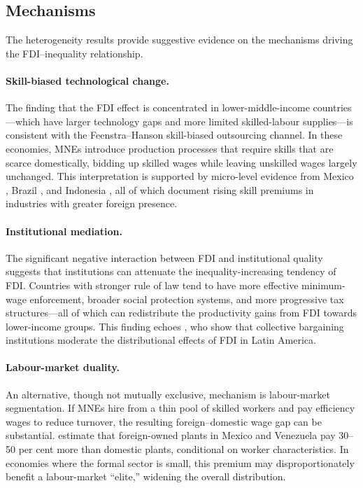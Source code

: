\documentclass[12pt,a4paper]{article}
\begin{document}
\subsection{Mechanisms}

The heterogeneity results provide suggestive evidence on the mechanisms driving the FDI--inequality relationship.

\paragraph{Skill-biased technological change.}
The finding that the FDI effect is concentrated in lower-middle-income countries---which have larger technology gaps and more limited skilled-labour supplies---is consistent with the Feenstra--Hanson skill-biased outsourcing channel.  In these economies, MNEs introduce production processes that require skills that are scarce domestically, bidding up skilled wages while leaving unskilled wages largely unchanged.  This interpretation is supported by micro-level evidence from Mexico \citep{Feenstra1997}, Brazil \citep{Menezes2006}, and Indonesia \citep{Lipsey2004}, all of which document rising skill premiums in industries with greater foreign presence.

\paragraph{Institutional mediation.}
The significant negative interaction between FDI and institutional quality suggests that institutions can attenuate the inequality-increasing tendency of FDI.  Countries with stronger rule of law tend to have more effective minimum-wage enforcement, broader social protection systems, and more progressive tax structures---all of which can redistribute the productivity gains from FDI towards lower-income groups.  This finding echoes \citet{Bogliaccini2009}, who show that collective bargaining institutions moderate the distributional effects of FDI in Latin America.

\paragraph{Labour-market duality.}
An alternative, though not mutually exclusive, mechanism is labour-market segmentation.  If MNEs hire from a thin pool of skilled workers and pay efficiency wages to reduce turnover, the resulting foreign--domestic wage gap can be substantial.  \citet{Aitken1996} estimate that foreign-owned plants in Mexico and Venezuela pay 30--50 per cent more than domestic plants, conditional on worker characteristics.  In economies where the formal sector is small, this premium may disproportionately benefit a labour-market ``elite,'' widening the overall distribution.
\end{document}
